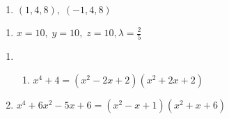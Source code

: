 \documentclass{ximera}
\begin{document}
\begin{enumerate}
\setcounter{enumi}{\value{HW}}

\item $(1, 4, 8), \; (-1, 4, 8)$


\setcounter{HW}{\value{enumi}}
\end{enumerate}

\begin{enumerate}
\setcounter{enumi}{\value{HW}}

\item $x = 10, \; y = 10, \; z = 10, \lambda = \frac{2}{5}$

\setcounter{HW}{\value{enumi}}
\end{enumerate}

\begin{enumerate}
\setcounter{enumi}{\value{HW}}

\item \begin{enumerate} 

\addtocounter{enumii}{2}

\item $x^{4} + 4 = (x^{2} - 2x + 2)(x^{2} + 2x + 2)$

\end{enumerate}

\item $x^{4} + 6x^{2} - 5x + 6 = (x^{2} - x + 1)(x^{2} + x + 6)$

\end{enumerate}
\end{document}
